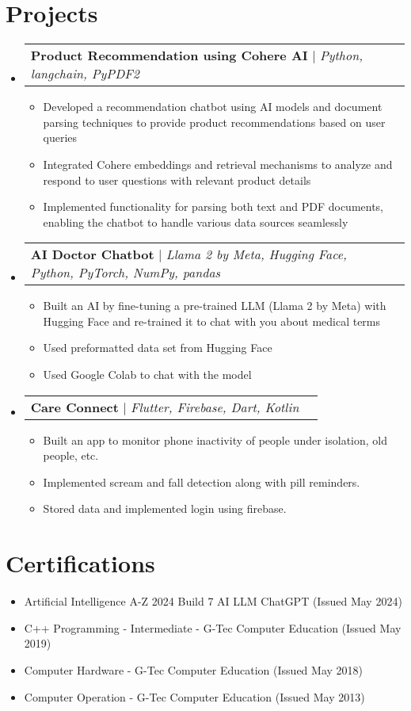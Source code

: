 \documentclass[letterpaper,11pt]{article}
\makeatletter
\newcommand{\resumeItem}[1]{
  \item\small{
    {#1 \vspace{-2pt}}
  }
}
\newcommand{\resumeProjectHeading}[2]{
    \item
    \begin{tabular*}{0.97\textwidth}{l@{\extracolsep{\fill}}r}
      \small#1 & #2 \\
    \end{tabular*}\vspace{-7pt}
}
\newcommand{\resumeSubHeadingListStart}{\begin{itemize}[leftmargin=0.15in, label={}]}
\newcommand{\resumeSubHeadingListEnd}{\end{itemize}}
\newcommand{\resumeItemListStart}{\begin{itemize}}
\newcommand{\resumeItemListEnd}{\end{itemize}\vspace{-5pt}}
\makeatother
\begin{document}
\section{Projects}
    \resumeSubHeadingListStart
      \resumeProjectHeading
          {\textbf{Product Recommendation using Cohere AI} $|$ \emph{Python, langchain, PyPDF2}}{}
          \resumeItemListStart
            \resumeItem{Developed a recommendation chatbot using AI models and document parsing techniques to provide product recommendations based on user queries}
            \resumeItem{Integrated Cohere embeddings and retrieval mechanisms to analyze and respond to user questions with relevant product details}
            \resumeItem{Implemented functionality for parsing both text and PDF documents, enabling the chatbot to handle various data sources seamlessly}
          \resumeItemListEnd
      \resumeProjectHeading
          {\textbf{AI Doctor Chatbot} $|$ \emph{Llama 2 by Meta, Hugging Face, Python, PyTorch, NumPy, pandas}}{}
          \resumeItemListStart
            \resumeItem{Built an AI by fine-tuning a pre-trained LLM (Llama 2 by Meta) with Hugging Face and re-trained it to chat with you about medical terms}
            \resumeItem{Used preformatted data set from Hugging Face}
            \resumeItem{Used Google Colab to chat with the model}
          \resumeItemListEnd
      \resumeProjectHeading
          {\textbf{Care Connect} $|$ \emph{Flutter, Firebase, Dart, Kotlin}}{}
          \resumeItemListStart
            \resumeItem{Built an app to monitor phone inactivity of people under isolation, old people, etc.}
            \resumeItem{Implemented scream and fall detection along with pill reminders.}
            \resumeItem{Stored data and implemented login using firebase.}
          \resumeItemListEnd
    \resumeSubHeadingListEnd

\section{Certifications}
  \resumeSubHeadingListStart
    \resumeItemListStart
      \resumeItem{Artificial Intelligence A-Z 2024 Build 7 AI LLM ChatGPT (Issued May 2024)}
      \resumeItem{C++ Programming - Intermediate - G-Tec Computer Education (Issued May 2019)}
      \resumeItem{Computer Hardware - G-Tec Computer Education (Issued May 2018)}
      \resumeItem{Computer Operation - G-Tec Computer Education (Issued May 2013)}
    \resumeItemListEnd
  \resumeSubHeadingListEnd
\end{document}
